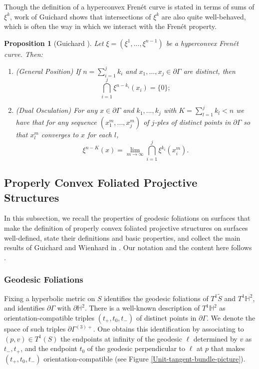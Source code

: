 \documentclass[12pt,a4paper]{amsart}
\theoremstyle{definition}
\theoremstyle{plain}
\newtheorem{proposition}[theorem]{Proposition}
\numberwithin{equation}{section}
\begin{document}
Though the definition of a hyperconvex Fren\'et curve is stated in terms of sums of $\xi^k$, work of Guichard \cite{guichard2005dualite} shows that intersections of $\xi^k$ are also quite well-behaved, which is often the way in which we interact with the Fren\'et property.

\begin{proposition}[Guichard \cite{guichard2005dualite}]\label{Intersection-lemmas}
    Let $\xi = (\xi^1, ..., \xi^{n-1})$ be a hyperconvex Fren\'et curve. Then:
    \begin{enumerate}
        \item (General Position) If $n = \sum_{i=1}^j k_i$ and $x_1, ..., x_j \in \partial \Gamma$ are distinct, then $$\bigcap_{i=1}^j \xi^{n-k_i}(x_i) = \{0\};$$
        \item (Dual Osculation) For any $x \in \partial \Gamma$ and $k_1,...,k_j$ with $K = \sum_{l=1}^j k_l < n$ we have that for any sequence $(x_1^m,...,x_j^m)$ of $j$-ples of distinct points in $\partial \Gamma$ so that $x_l^m $ converges to $x$ for each $l$, $$\xi^{n-K}(x) = \lim\limits_{m \to \infty} \bigcap_{i=1}^j \xi^{k_i}(x_i^m).$$
    \end{enumerate}
\end{proposition}

\subsection{Properly Convex Foliated Projective Structures}

In this subsection, we recall the properties of geodesic foliations on surfaces that make the definition of properly convex foliated projective structures on surfaces well-defined, state their definitions and basic properties, and collect the main results of Guichard and Wienhard in \cite{guichard2008convex}. Our notation and the content here follows \cite{guichard2008convex}.

\subsubsection{Geodesic Foliations}

Fixing a hyperbolic metric on $S$ identifies the geodesic foliations of $T^1 \widetilde{S}$ and $T^1\mathbb{H}^2$, and identifies $\partial \Gamma$ with $\partial \mathbb{H}^2$. There is a well-known description of $T^1\mathbb{H}^2$ as orientation-compatible triples $(t_+, t_0,t_-)$ of distinct points in $\partial \Gamma$. We denote the space of such triples $\partial \Gamma^{(3)+}$. One obtains this identification by associating to $(p,v) \in T^1(S)$ the endpoints at infinity of the geodesic $\ell$ determined by $v$ as $t_-, t_+$, and the endpoint $t_0$ of the geodesic perpendicular to $\ell$ at $p$ that makes $(t_+, t_0,t_-)$ orientation-compatible (see Figure \ref{Unit-tangent-bundle-picture}).
\end{document}
